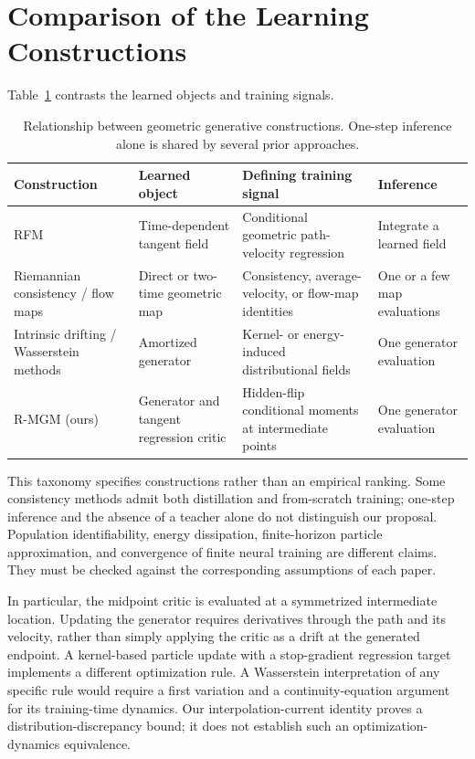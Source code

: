 \section{Comparison of the Learning Constructions}
\label{app:comparisons}
Table~\ref{tab:constructions} contrasts the learned objects and training signals.
\begin{table}[t]
\caption{Relationship between geometric generative constructions. One-step inference alone is shared by several prior approaches.}
\label{tab:constructions}
\centering\small
\begin{tabular}{@{}p{}p{}p{}p{}@{}}
\toprule
Construction & Learned object & Defining training signal & Inference \\
\midrule
RFM \citep{chen2024general} & Time-dependent tangent field & Conditional geometric path-velocity regression & Integrate a learned field \\
Riemannian consistency / flow maps \citep{cheng2025rcm,davis2026gfm,woo2026rmf,zhong2026rmf} & Direct or two-time geometric map & Consistency, average-velocity, or flow-map identities & One or a few map evaluations \\
Intrinsic drifting / Wasserstein methods \citep{estebancasadevall2026kgdm,nurgulan2026rwflow,li2026rwgf} & Amortized generator & Kernel- or energy-induced distributional fields & One generator evaluation \\
R-MGM (ours) & Generator and tangent regression critic & Hidden-flip conditional moments at intermediate points & One generator evaluation \\
\bottomrule
\end{tabular}
\end{table}
This taxonomy specifies constructions rather than an empirical ranking. Some consistency methods admit both distillation and from-scratch training; one-step inference and the absence of a teacher alone do not distinguish our proposal. Population identifiability, energy dissipation, finite-horizon particle approximation, and convergence of finite neural training are different claims. They must be checked against the corresponding assumptions of each paper.

In particular, the midpoint critic is evaluated at a symmetrized intermediate location. Updating the generator requires derivatives through the path and its velocity, rather than simply applying the critic as a drift at the generated endpoint. A kernel-based particle update with a stop-gradient regression target implements a different optimization rule. A Wasserstein interpretation of any specific rule would require a first variation and a continuity-equation argument for its training-time dynamics. Our interpolation-current identity proves a distribution-discrepancy bound; it does not establish such an optimization-dynamics equivalence.


